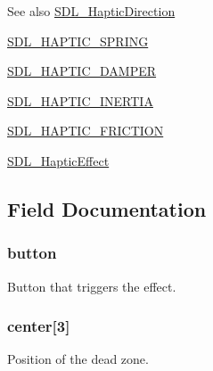 \begin{DoxySeeAlso}{See also}
\hyperlink{struct_s_d_l___haptic_direction}{S\+D\+L\+\_\+\+Haptic\+Direction} 

\hyperlink{_s_d_l__haptic_8h_a3b52d4700380085e2b5d87bb20320fb1}{S\+D\+L\+\_\+\+H\+A\+P\+T\+I\+C\+\_\+\+S\+P\+R\+I\+NG} 

\hyperlink{_s_d_l__haptic_8h_a69522f261973e3ea4273486141320a87}{S\+D\+L\+\_\+\+H\+A\+P\+T\+I\+C\+\_\+\+D\+A\+M\+P\+ER} 

\hyperlink{_s_d_l__haptic_8h_a14b807471589120395aec28293cf6642}{S\+D\+L\+\_\+\+H\+A\+P\+T\+I\+C\+\_\+\+I\+N\+E\+R\+T\+IA} 

\hyperlink{_s_d_l__haptic_8h_a98a5011311168d63921aaac21403a4d8}{S\+D\+L\+\_\+\+H\+A\+P\+T\+I\+C\+\_\+\+F\+R\+I\+C\+T\+I\+ON} 

\hyperlink{union_s_d_l___haptic_effect}{S\+D\+L\+\_\+\+Haptic\+Effect} 
\end{DoxySeeAlso}


\subsection{Field Documentation}
\subsubsection[{\texorpdfstring{button}{button}}]{ button}\hypertarget{struct_s_d_l___haptic_condition_a9dab31b41646c5d046ea33d0cfb3794a}{}\label{struct_s_d_l___haptic_condition_a9dab31b41646c5d046ea33d0cfb3794a}
Button that triggers the effect. 
\subsubsection[{\texorpdfstring{center}{center}}]{ center\mbox{[}3\mbox{]}}\hypertarget{struct_s_d_l___haptic_condition_a28fd31ca00c3317c065d75a364a65c37}{}\label{struct_s_d_l___haptic_condition_a28fd31ca00c3317c065d75a364a65c37}
Position of the dead zone. 
